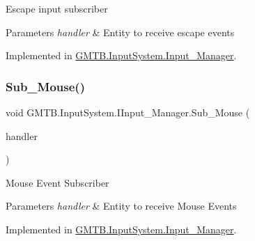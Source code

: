 Escape input subscriber 


\begin{DoxyParams}{Parameters}
{\em handler} & Entity to receive escape events\\
\hline
\end{DoxyParams}


Implemented in \mbox{\hyperlink{class_g_m_t_b_1_1_input_system_1_1_input___manager_adf40d6cb8cb0df480fe10675ba230786}{G\+M\+T\+B.\+Input\+System.\+Input\+\_\+\+Manager}}.

\mbox{\label{interface_g_m_t_b_1_1_input_system_1_1_i_input___manager_aa3ac395ab08cf7cf51506dec5a6f0936}} 
\subsubsection{\texorpdfstring{Sub\_Mouse()}{Sub\_Mouse()}}
{\footnotesize\ttfamily void G\+M\+T\+B.\+Input\+System.\+I\+Input\+\_\+\+Manager.\+Sub\+\_\+\+Mouse (\begin{DoxyParamCaption}\item[{Event\+Handler$<$ \mbox{\hyperlink{class_g_m_t_b_1_1_input_system_1_1_mouse_event}{Mouse\+Event}} $>$}]{handler }\end{DoxyParamCaption})}



Mouse Event Subscriber 


\begin{DoxyParams}{Parameters}
{\em handler} & Entity to receive Mouse Events \\
\hline
\end{DoxyParams}


Implemented in \mbox{\hyperlink{class_g_m_t_b_1_1_input_system_1_1_input___manager_a44403aa4e08bb3e60e030689b8d178f6}{G\+M\+T\+B.\+Input\+System.\+Input\+\_\+\+Manager}}.

\mbox{\label{interface_g_m_t_b_1_1_input_system_1_1_i_input___manager_aa90d83a923d091d5721c7a00be376ed4}} 
